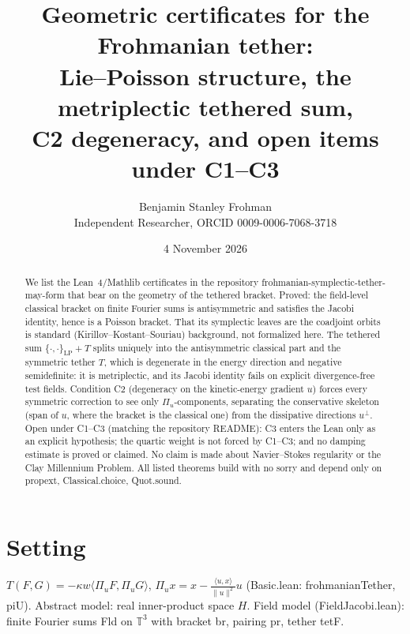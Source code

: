 \documentclass[11pt]{article}
\title{Geometric certificates for the Frohmanian tether:\\ Lie--Poisson structure, the metriplectic tethered sum,\\ C2 degeneracy, and open items under C1--C3}
\author{Benjamin Stanley Frohman\\ Independent Researcher, ORCID 0009-0006-7068-3718}
\date{4 November 2026}
\renewcommand{\texttt}[1]{{\ttfamily\hyphenchar\font=45\relax\textup{#1}}}
\begin{document}
\maketitle
\begin{abstract}
We list the Lean~4/Mathlib certificates in the repository \texttt{frohmanian-symplectic-tether-may-form} that bear on the geometry of the tethered bracket. Proved: the field-level classical bracket on finite Fourier sums is antisymmetric and satisfies the Jacobi identity, hence is a Poisson bracket. That its symplectic leaves are the coadjoint orbits is standard (Kirillov--Kostant--Souriau) background, not formalized here. The tethered sum $\{\cdot,\cdot\}_{\mathrm{LP}}+T$ splits uniquely into the antisymmetric classical part and the symmetric tether $T$, which is degenerate in the energy direction and negative semidefinite: it is metriplectic, and its Jacobi identity fails on explicit divergence-free test fields. Condition C2 (degeneracy on the kinetic-energy gradient $u$) forces every symmetric correction to see only $\Pi_u$-components, separating the conservative skeleton (span of $u$, where the bracket is the classical one) from the dissipative directions $u^\perp$. Open under C1--C3 (matching the repository README): C3 enters the Lean only as an explicit hypothesis; the quartic weight is not forced by C1--C3; and no damping estimate is proved or claimed. No claim is made about Navier--Stokes regularity or the Clay Millennium Problem. All listed theorems build with no \texttt{sorry} and depend only on \texttt{propext}, \texttt{Classical.choice}, \texttt{Quot.sound}.
\end{abstract}

\section*{Setting}
$T(F,G)=-\kappa w\langle \Pi_u F,\Pi_u G\rangle$, $\Pi_u x=x-\frac{\langle u,x\rangle}{\|u\|^2}u$ (\texttt{Basic.lean}: \texttt{frohmanianTether}, \texttt{piU}). Abstract model: real inner-product space $H$. Field model (\texttt{FieldJacobi.lean}): finite Fourier sums \texttt{Fld} on $\mathbb T^3$ with bracket \texttt{br}, pairing \texttt{pr}, tether \texttt{tetF}.
\end{document}
